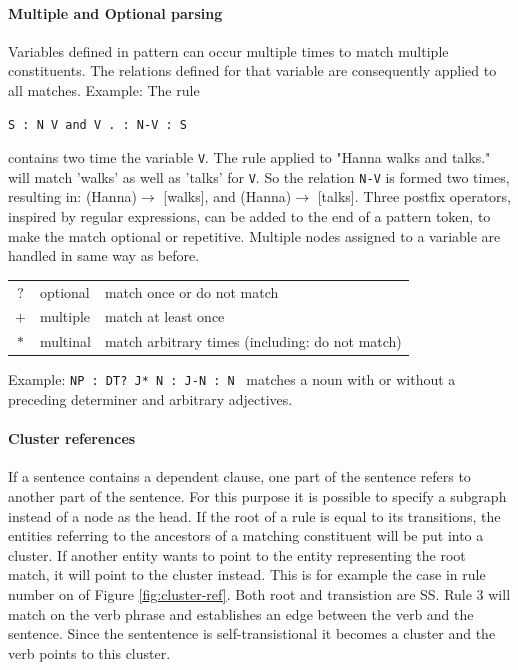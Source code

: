 \documentclass[english]{article}
\begin{document}
\paragraph{Multiple and Optional parsing}
\label{para:multi}
Variables defined in pattern can occur multiple times to match multiple constituents. The relations defined for that variable are consequently applied to all matches. Example: The rule 
\begin{lstlisting}[xleftmargin=.2\textwidth, xrightmargin=.2\textwidth]
S : N V and V . : N-V : S
\end{lstlisting}
contains two time the variable \lstinline{V}. The rule applied to "Hanna walks and talks." will match 'walks' as well as 'talks' for \lstinline{V}. So the relation \lstinline{N-V} is formed two times, resulting in: (Hanna)$\rightarrow$ [walks], and (Hanna)$\rightarrow$ [talks].
Three postfix operators, inspired by regular expressions, can be added to the end of a pattern token, to make the match optional or repetitive. Multiple nodes assigned to a variable are handled in same way as before.

\begin{table}[H]
\begin{tabular}{cll}
  $\mathbf{?}$ & optional & match once or do not match\\
  $+$ & multiple & match at least once\\
  $*$ & multinal & match arbitrary times (including: do not match)\\ 
\end{tabular}
\end{table}

\noindent Example: \lstinline{NP : DT? J* N : J-N : N} \ matches a noun with or without a preceding determiner and arbitrary adjectives.


\paragraph{Cluster references}
If a sentence contains a dependent clause, one part of the sentence refers to another part of the sentence. For this purpose it is possible to specify a subgraph instead of a node as the head. If the root of a rule is equal to its transitions, the entities referring to the ancestors of a matching constituent will be put into a cluster. If another entity wants to point to the entity representing the root match, it will point to the cluster instead. This is for example the case in rule number on of Figure \ref{fig:cluster-ref}. Both root and transistion are SS. Rule 3 will match on the verb phrase and establishes an edge between the verb and the sentence. Since the sententence is self-transistional it becomes a cluster and the verb points to this cluster.
\end{document}
